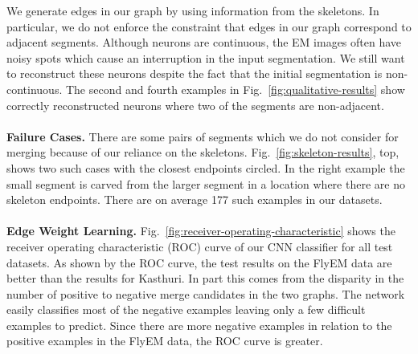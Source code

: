 We generate edges in our graph by using information from the skeletons. 
In particular, we do not enforce the constraint that edges in our graph correspond to adjacent segments.
Although neurons are continuous, the EM images often have noisy spots which cause an interruption in the input segmentation.
We still want to reconstruct these neurons despite the fact that the initial segmentation is non-continuous. 
The second and fourth examples in Fig.~\ref{fig:qualitative-results} show correctly reconstructed neurons where two of the segments are non-adjacent. 
\\~\\
\noindent\textbf{Failure Cases.}
There are some pairs of segments which we do not consider for merging because of our reliance on the skeletons.
Fig.~\ref{fig:skeleton-results}, top, shows two such cases with the closest endpoints circled. 
In the right example the small segment is carved from the larger segment in a location where there are no skeleton endpoints. 
There are on average 177 such examples in our datasets.
\\~\\
\noindent\textbf{Edge Weight Learning.}
Fig.~\ref{fig:receiver-operating-characteristic} shows the receiver operating characteristic (ROC) curve of our CNN classifier for all test datasets.
As shown by the ROC curve, the test results on the FlyEM data are better than the results for Kasthuri.
In part this comes from the disparity in the number of positive to negative merge candidates in the two graphs. 
The network easily classifies most of the negative examples leaving only a few difficult examples to predict.
Since there are more negative examples in relation to the positive examples in the FlyEM data, the ROC curve is greater.

